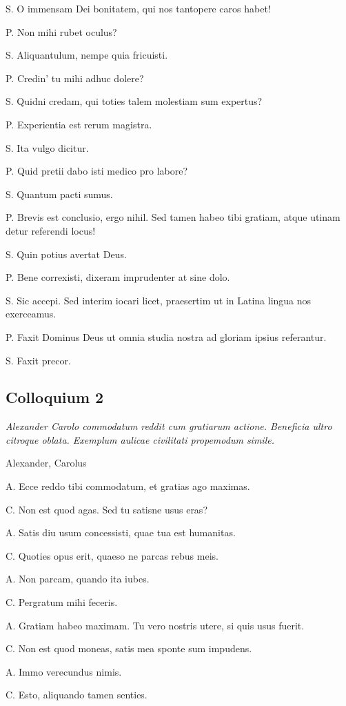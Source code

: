 \documentclass{article}
\begin{document}
S. O immensam Dei bonitatem, qui nos tantopere caros habet!

P. Non mihi rubet oculus?

S. Aliquantulum, nempe quia fricuisti.

P. Credin' tu mihi adhuc dolere?

S. Quidni credam, qui toties talem molestiam sum expertus?

P. Experientia est rerum magistra.

S. Ita vulgo dicitur.

P. Quid pretii dabo isti medico pro labore?

S. Quantum pacti sumus.

P. Brevis est conclusio, ergo nihil. Sed tamen habeo tibi gratiam, atque utinam detur referendi locus!

S. Quin potius avertat Deus.

P. Bene correxisti, dixeram imprudenter at sine dolo.

S. Sic accepi. Sed interim iocari licet, praesertim ut in Latina lingua nos exerceamus.

P. Faxit Dominus Deus ut omnia studia nostra ad gloriam ipsius referantur.

S. Faxit precor.

\subsection{Colloquium 2}
\emph{Alexander Carolo commodatum reddit cum gratiarum actione. Beneficia ultro citroque oblata. Exemplum aulicae civilitati propemodum simile.}

Alexander, Carolus

A. Ecce reddo tibi commodatum, et gratias ago maximas.

C. Non est quod agas. Sed tu satisne usus eras?

A. Satis diu usum concessisti, quae tua est humanitas.

C. Quoties opus erit, quaeso ne parcas rebus meis.

A. Non parcam, quando ita iubes.

C. Pergratum mihi feceris.

A. Gratiam habeo maximam. Tu vero nostris utere, si quis usus fuerit.

C. Non est quod moneas, satis mea sponte sum impudens.

A. Immo verecundus nimis.

C. Esto, aliquando tamen senties.
\end{document}
